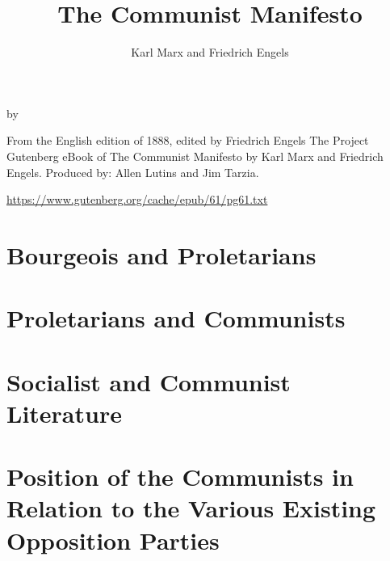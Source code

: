 \documentclass[fontsize=12pt,a5paper,BCOR=12mm,DIV=calc,twoside]{scrbook}
\title{The Communist Manifesto}
\author{Karl Marx and Friedrich Engels}
\date{}
\begin{document}

\makeatletter
\begin{titlepage}
	\setlength{\parindent}{0pt}
	\vspace*{.15\textheight}
	\bigbreak
	{\Huge \slshape	 \@title \par}
	\medbreak
	{\large by \scshape \@author\par}
	\bigbreak
	{\small From the English edition of 1888, edited by Friedrich Engels}
        \vfill
        {\small The Project Gutenberg eBook of The Communist Manifesto by Karl Marx and Friedrich Engels. Produced by: Allen Lutins and Jim Tarzia.}\par
        {\tiny \url{https://www.gutenberg.org/cache/epub/61/pg61.txt}}
\end{titlepage}
\makeatother

\tableofcontents
\mainmatter


\chapter*{}


\chapter{Bourgeois and Proletarians}


\chapter{Proletarians and Communists}


\chapter{Socialist and Communist Literature}


\chapter[Position of the Communists]{Position of the Communists in Relation to the Various Existing Opposition Parties}

%
\end{document}
